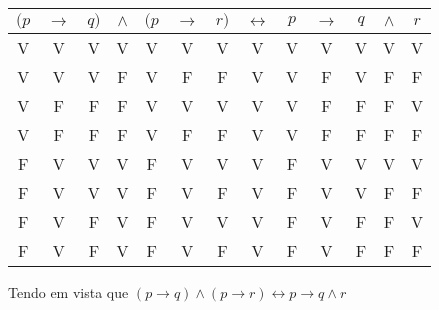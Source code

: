 \documentclass[12pt,a4paper,oneside]{article}
\begin{document}
\begin{enumerate}
{	\begin{tabular}{|c|c|c|c|c|c|c|c|c|c|c|c|c|}
		\hline
		$(p$ & $\rightarrow$ & $q)$ & $\wedge$ & $(p$ & $\rightarrow$ & $r)$ & $\leftrightarrow$ & $p$ & $\rightarrow$	& $q$ & $\wedge$ & $r$  \\
		\hline
		V & V & V & {\color{black} V} & V & V & V & {\color{black} V} & V & {\color{black} V} & V & V & V\\
		V & V & V & {\color{black} F} & V & F & F & {\color{black} V} & V & {\color{black} F} & V & F & F\\
		V & F & F & {\color{black} F} & V & V & V & {\color{black} V} & V & {\color{black} F} & F & F & V\\
		V & F & F & {\color{black} F} & V & F & F & {\color{black} V} & V & {\color{black} F} & F & F & F\\
		F & V & V & {\color{black} V} & F & V & V & {\color{black} V} & F & {\color{black} V} & V & V & V\\
		F & V & V & {\color{black} V} & F & V & F & {\color{black} V} & F & {\color{black} V} & V & F & F\\
		F & V & F & {\color{black} V} & F & V & V & {\color{black} V} & F & {\color{black} V} & F & F & V\\
		F & V & F & {\color{black} V} & F & V & F & {\color{black} V} & F & {\color{black} V} & F & F & F\\
		\hline
	\end{tabular}

	Tendo em vista que $(p \rightarrow q) \wedge (p \rightarrow r) \leftrightarrow p \rightarrow q \wedge r$
	
	}

\end{enumerate}
\end{document}
